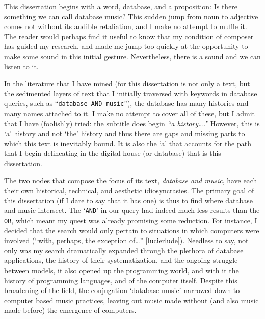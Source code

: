 This dissertation begins with a word, database, and a proposition: Is there something we can call database music? This sudden jump from noun to adjective comes not without its audible retaliation, and I make no attempt to muffle it. The reader would perhaps find it useful to know that my condition of composer has guided my research, and made me jump too quickly at the opportunity to make some sound in this initial gesture. Nevertheless, there is a sound and we can listen to it. %


In the literature that I have mined (for this dissertation is not only a text, but the sedimented layers of text that I initially traversed with keywords in database queries, such as ``\texttt{database AND music}''), the database has many histories and many names attached to it. I make no attempt to cover all of these, but I admit that I have (foolishly) tried: the subtitle does begin \textit{``a history\dots.''} However, this is `a’ history and not `the’ history and thus there are gaps and missing parts to which this text is inevitably bound. It is also the `a' that accounts for the path that I begin delineating in the digital house (or database) that is this dissertation.

The two nodes that compose the focus of its text, \textit{database and music}, have each their own historical, technical, and aesthetic idiosyncrasies. The primary goal of this dissertation (if I dare to say that it has one) is thus to find where database and music intersect. The `\texttt{AND}' in our query had indeed much less results than the \texttt{OR}, which meant my quest was already promising some reduction. For instance, I decided that the search would only pertain to situations in which computers were involved (``with, perhaps, the exception of\dots'' \ref{lucierlude}). Needless to say, not only was my search dramatically expanded through the plethora of database applications, the history of their systematization, and the ongoing struggle between models, it also opened up the programming world, and with it the history of programming languages, and of the computer itself. Despite this broadening of the field, the conjugation `database music' narrowed down to computer based music practices, leaving out music made without (and also music made before) the emergence of computers.



